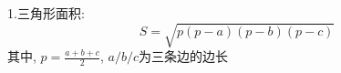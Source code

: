 \documentclass[UTF8, fontset=ubuntu]{ctexart}
\begin{document}
1.三角形面积:\\
\[S=\sqrt{p(p-a)(p-b)(p-c)}\]
其中, $\displaystyle p=\frac{a+b+c}{2}$, $a/b/c$为三条边的边长\\
\end{document}
